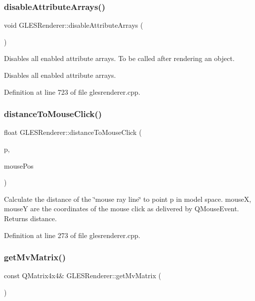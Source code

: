 \subsubsection{\texorpdfstring{disableAttributeArrays()}{disableAttributeArrays()}}
{\footnotesize\ttfamily void G\+L\+E\+S\+Renderer\+::disable\+Attribute\+Arrays (\begin{DoxyParamCaption}{ }\end{DoxyParamCaption})\hspace{0.3cm}{\ttfamily [virtual]}}

Disables all enabled attribute arrays. To be called after rendering an object.

Disables all enabled attribute arrays. 

Definition at line 723 of file glesrenderer.\+cpp.

\mbox{\label{class_g_l_e_s_renderer_a6f31b6893897549f3762a88a8bf135f8}} 
\subsubsection{\texorpdfstring{distanceToMouseClick()}{distanceToMouseClick()}}
{\footnotesize\ttfamily float G\+L\+E\+S\+Renderer\+::distance\+To\+Mouse\+Click (\begin{DoxyParamCaption}\item[{Q\+Vector3D}]{p,  }\item[{const Q\+Point \&}]{mouse\+Pos }\end{DoxyParamCaption})}

Calculate the distance of the \char`\"{}mouse ray line\char`\"{} to point p in model space. mouseX, mouseY are the coordinates of the mouse click as delivered by Q\+Mouse\+Event. Returns distance. 

Definition at line 273 of file glesrenderer.\+cpp.

\mbox{\label{class_g_l_e_s_renderer_af6f079ccbe2e37b90018dde13ad36b94}} 
\subsubsection{\texorpdfstring{getMvMatrix()}{getMvMatrix()}}
{\footnotesize\ttfamily const Q\+Matrix4x4\& G\+L\+E\+S\+Renderer\+::get\+Mv\+Matrix (\begin{DoxyParamCaption}{ }\end{DoxyParamCaption})\hspace{0.3cm}{\ttfamily [inline]}}

